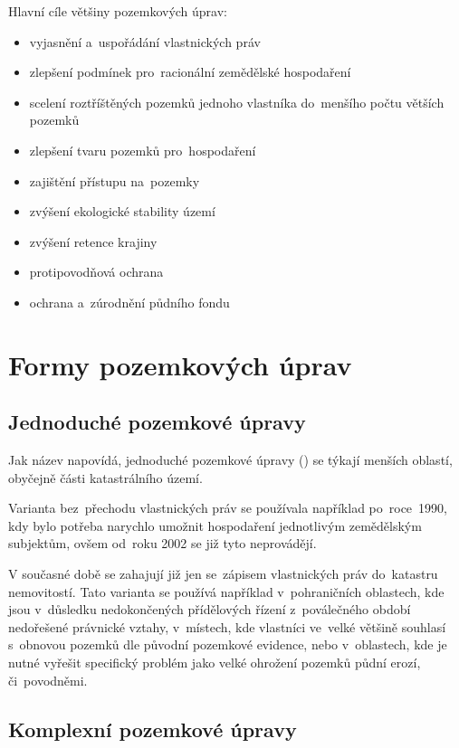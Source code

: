 Hlavní cíle většiny pozemkových úprav:
\vspace{-\topsep}
	\begin{itemize}[leftmargin=1.5cm, noitemsep]
		\item vyjasnění a~uspořádání vlastnických práv
		\item zlepšení podmínek pro~racionální zemědělské hospodaření
		\item scelení roztříštěných pozemků jednoho vlastníka do~menšího počtu větších pozemků
		\item zlepšení tvaru pozemků pro~hospodaření
		\item zajištění přístupu na~pozemky
		\item zvýšení ekologické stability území
		\item zvýšení retence krajiny
		\item protipovodňová ochrana
		\item ochrana a~zúrodnění půdního fondu
	\end{itemize}

\section{Formy pozemkových úprav}
\label{formy_pu}

\subsection{Jednoduché pozemkové úpravy}
\label{jednoduche_pu}

Jak název napovídá, jednoduché pozemkové úpravy () se týkají
menších oblastí, obyčejně části katastrálního území.

Varianta  bez~přechodu vlastnických práv se používala
například po~ro\-ce~1990, kdy bylo potřeba narychlo umožnit
hospodaření jednotlivým zemědělským subjektům, ovšem od~roku 2002 se
již tyto  neprovádějí.

V současné době se zahajují již jen  se~zápisem vlastnických
práv do~kata\-stru nemovitostí. Tato varianta  se používá
například v~pohraničních oblastech, kde jsou v~důsledku nedokončených
přídělových řízení z~poválečného období nedořešené právnické vztahy,
v~místech, kde vlastníci ve~velké většině souhlasí s~obnovou pozemků
dle původní pozemkové evidence, nebo v~oblastech, kde je nutné vyřešit
specifický problém jako velké ohrožení pozemků půdní erozí,
či~povodněmi.

\subsection{Komplexní pozemkové úpravy}
\label{komplexní_pu}

